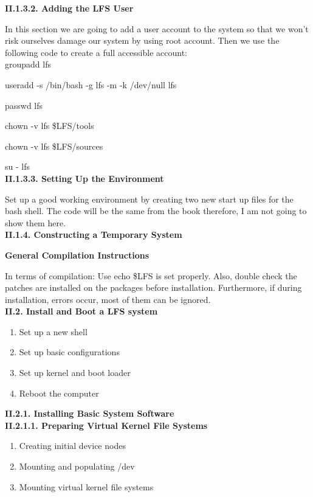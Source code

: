 \documentclass[a4paper,12pt]{report}
\begin{document}
\noindent
\textbf{II.1.3.2. Adding the LFS User}

\noindent
In this section we are going to add a user account to the system so that we won't risk ourselves damage our system by using root account. Then we use the following code to create a full accessible account:\\

\noindent
groupadd lfs

\noindent
useradd -s /bin/bash -g lfs -m -k /dev/null lfs

\noindent
passwd lfs

\noindent
chown -v lfs \$LFS/tools

\noindent
chown -v lfs \$LFS/sources

\noindent
su - lfs\\

\noindent
\textbf{II.1.3.3. Setting Up the Environment}

\noindent
Set up a good working environment by creating two new start up files for the bash shell. The code will be the same from the book therefore, I am not going to show them here. \\

\noindent
\textbf{II.1.4. Constructing a Temporary System}

\noindent
\textbf{General Compilation Instructions}

\noindent
In terms of compilation: Use echo \$LFS is set properly. Also, double check the patches are installed on the packages before installation. Furthermore, if during installation, errors occur, most of them can be ignored. \\

\noindent
\textbf{II.2. Install and Boot a LFS system}

\begin{enumerate}
\item Set up a new shell
\item Set up basic configurations
\item Set up kernel and boot loader
\item Reboot the computer
\end{enumerate}

\noindent
\textbf{II.2.1. Installing Basic System Software}\\

\noindent
\textbf{II.2.1.1. Preparing Virtual Kernel File Systems}

\begin{enumerate}
\item Creating initial device nodes
\item Mounting and populating /dev
\item Mounting virtual kernel file systems
\end{enumerate}
\end{document}

